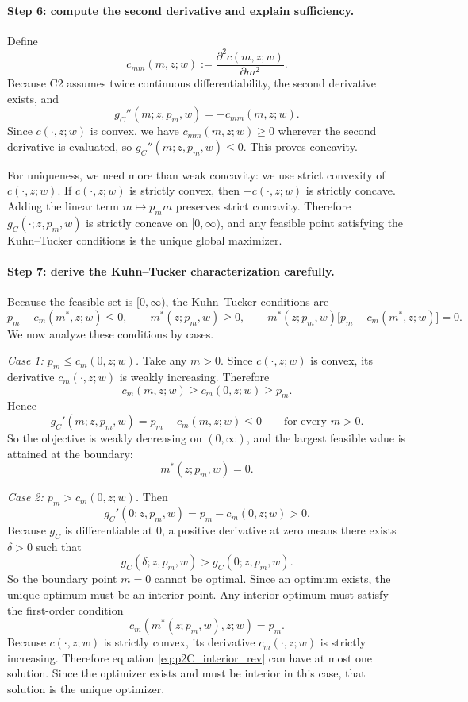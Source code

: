\paragraph{Step 6: compute the second derivative and explain sufficiency.}
Define
\[
c_{mm}(m,z;w):=\frac{\partial^2 c(m,z;w)}{\partial m^2}.
\]
Because C2 assumes twice continuous differentiability, the second derivative exists, and
\begin{equation}
g_C''(m;z,p_m,w)=-c_{mm}(m,z;w).
\label{eq:p2C_second_derivative_rev}
\end{equation}
Since $c(\cdot,z;w)$ is convex, we have $c_{mm}(m,z;w)\ge 0$ wherever the second derivative is evaluated, so $g_C''(m;z,p_m,w)\le 0$. This proves concavity.

For uniqueness, we need more than weak concavity: we use strict convexity of $c(\cdot,z;w)$. If $c(\cdot,z;w)$ is strictly convex, then $-c(\cdot,z;w)$ is strictly concave. Adding the linear term $m\mapsto p_m m$ preserves strict concavity. Therefore $g_C(\cdot;z,p_m,w)$ is strictly concave on $[0,\infty)$, and any feasible point satisfying the Kuhn--Tucker conditions is the unique global maximizer.

\paragraph{Step 7: derive the Kuhn--Tucker characterization carefully.}
Because the feasible set is $[0,\infty)$, the Kuhn--Tucker conditions are
\begin{equation}
p_m-c_m(m^*,z;w)\le 0,\qquad
m^*(z;p_m,w)\ge 0,\qquad
m^*(z;p_m,w)\bigl[p_m-c_m(m^*,z;w)\bigr]=0.
\label{eq:p2C_KKT_rev}
\end{equation}
We now analyze these conditions by cases.

\textit{Case 1: $p_m\le c_m(0,z;w)$.}
Take any $m>0$. Since $c(\cdot,z;w)$ is convex, its derivative $c_m(\cdot,z;w)$ is weakly increasing. Therefore
\[
c_m(m,z;w)\ge c_m(0,z;w)\ge p_m.
\]
Hence
\[
g_C'(m;z,p_m,w)=p_m-c_m(m,z;w)\le 0
\qquad\text{for every }m>0.
\]
So the objective is weakly decreasing on $(0,\infty)$, and the largest feasible value is attained at the boundary:
\begin{equation}
m^*(z;p_m,w)=0.
\label{eq:p2C_boundary_rev}
\end{equation}

\textit{Case 2: $p_m>c_m(0,z;w)$.}
Then
\[
g_C'(0;z,p_m,w)=p_m-c_m(0,z;w)>0.
\]
Because $g_C$ is differentiable at $0$, a positive derivative at zero means there exists $\delta>0$ such that
\[
g_C(\delta;z,p_m,w)>g_C(0;z,p_m,w).
\]
So the boundary point $m=0$ cannot be optimal. Since an optimum exists, the unique optimum must be an interior point. Any interior optimum must satisfy the first-order condition
\begin{equation}
c_m(m^*(z;p_m,w),z;w)=p_m.
\label{eq:p2C_interior_rev}
\end{equation}
Because $c(\cdot,z;w)$ is strictly convex, its derivative $c_m(\cdot,z;w)$ is strictly increasing. Therefore equation \eqref{eq:p2C_interior_rev} can have at most one solution. Since the optimizer exists and must be interior in this case, that solution is the unique optimizer.

